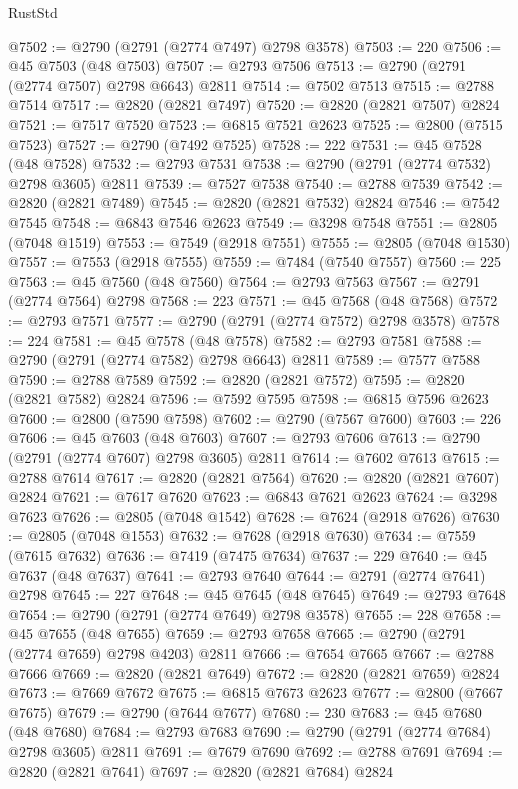 \begin{lexlean}{RustStd}
\begin{coremodule}
@7502 := @2790 (@2791 (@2774 @7497) @2798 @3578)
@7503 := 220
@7506 := @45 @7503 (@48 @7503)
@7507 := @2793 @7506
@7513 := @2790 (@2791 (@2774 @7507) @2798 @6643) @2811
@7514 := @7502 @7513
@7515 := @2788 @7514
@7517 := @2820 (@2821 @7497)
@7520 := @2820 (@2821 @7507) @2824
@7521 := @7517 @7520
@7523 := @6815 @7521 @2623
@7525 := @2800 (@7515 @7523)
@7527 := @2790 (@7492 @7525)
@7528 := 222
@7531 := @45 @7528 (@48 @7528)
@7532 := @2793 @7531
@7538 := @2790 (@2791 (@2774 @7532) @2798 @3605) @2811
@7539 := @7527 @7538
@7540 := @2788 @7539
@7542 := @2820 (@2821 @7489)
@7545 := @2820 (@2821 @7532) @2824
@7546 := @7542 @7545
@7548 := @6843 @7546 @2623
@7549 := @3298 @7548
@7551 := @2805 (@7048 @1519)
@7553 := @7549 (@2918 @7551)
@7555 := @2805 (@7048 @1530)
@7557 := @7553 (@2918 @7555)
@7559 := @7484 (@7540 @7557)
@7560 := 225
@7563 := @45 @7560 (@48 @7560)
@7564 := @2793 @7563
@7567 := @2791 (@2774 @7564) @2798
@7568 := 223
@7571 := @45 @7568 (@48 @7568)
@7572 := @2793 @7571
@7577 := @2790 (@2791 (@2774 @7572) @2798 @3578)
@7578 := 224
@7581 := @45 @7578 (@48 @7578)
@7582 := @2793 @7581
@7588 := @2790 (@2791 (@2774 @7582) @2798 @6643) @2811
@7589 := @7577 @7588
@7590 := @2788 @7589
@7592 := @2820 (@2821 @7572)
@7595 := @2820 (@2821 @7582) @2824
@7596 := @7592 @7595
@7598 := @6815 @7596 @2623
@7600 := @2800 (@7590 @7598)
@7602 := @2790 (@7567 @7600)
@7603 := 226
@7606 := @45 @7603 (@48 @7603)
@7607 := @2793 @7606
@7613 := @2790 (@2791 (@2774 @7607) @2798 @3605) @2811
@7614 := @7602 @7613
@7615 := @2788 @7614
@7617 := @2820 (@2821 @7564)
@7620 := @2820 (@2821 @7607) @2824
@7621 := @7617 @7620
@7623 := @6843 @7621 @2623
@7624 := @3298 @7623
@7626 := @2805 (@7048 @1542)
@7628 := @7624 (@2918 @7626)
@7630 := @2805 (@7048 @1553)
@7632 := @7628 (@2918 @7630)
@7634 := @7559 (@7615 @7632)
@7636 := @7419 (@7475 @7634)
@7637 := 229
@7640 := @45 @7637 (@48 @7637)
@7641 := @2793 @7640
@7644 := @2791 (@2774 @7641) @2798
@7645 := 227
@7648 := @45 @7645 (@48 @7645)
@7649 := @2793 @7648
@7654 := @2790 (@2791 (@2774 @7649) @2798 @3578)
@7655 := 228
@7658 := @45 @7655 (@48 @7655)
@7659 := @2793 @7658
@7665 := @2790 (@2791 (@2774 @7659) @2798 @4203) @2811
@7666 := @7654 @7665
@7667 := @2788 @7666
@7669 := @2820 (@2821 @7649)
@7672 := @2820 (@2821 @7659) @2824
@7673 := @7669 @7672
@7675 := @6815 @7673 @2623
@7677 := @2800 (@7667 @7675)
@7679 := @2790 (@7644 @7677)
@7680 := 230
@7683 := @45 @7680 (@48 @7680)
@7684 := @2793 @7683
@7690 := @2790 (@2791 (@2774 @7684) @2798 @3605) @2811
@7691 := @7679 @7690
@7692 := @2788 @7691
@7694 := @2820 (@2821 @7641)
@7697 := @2820 (@2821 @7684) @2824

\end{coremodule}
\end{lexlean}
